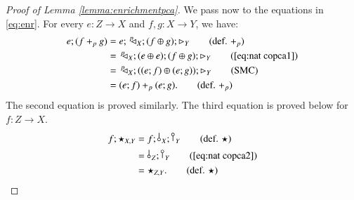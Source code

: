\begin{proof}[Proof of Lemma \ref{lemma:enrichmentpca}]
    We pass now to the equations in \eqref{eq:enr}. For every $e\colon Z \to X$ and $f,g\colon X \to Y$, we have:  
    \begin{align}
        e;(f +_p g) & = e;\,\diagp{X};(f \oplus g);\codiag{Y} \tag{def. $+_p$}\\
        & =\, \diagp{X};(e \oplus e);(f \oplus g);\codiag{Y} \tag{\ref{eq:nat copca1}}\\
        & =\, \diagp{X};((e;f) \oplus (e;g));\codiag{Y} \tag{SMC}\\
        & = (e;f) +_p (e;g). \tag{def. $+_{p}$}
    \end{align}
The second equation is proved similarly. The third equation is proved below for $f\colon Z\to X$.
    \begin{align}
        f;\star_{X,Y} & = f;\,\bangp{X};\cobang{Y} \tag{def. $\star$}\\
        & =\, \bangp{Z};\cobang{Y} \tag{\ref{eq:nat copca2}}\\
        & = \star_{Z,Y}. \tag{def. $\star$}
    \end{align}
\end{proof}

